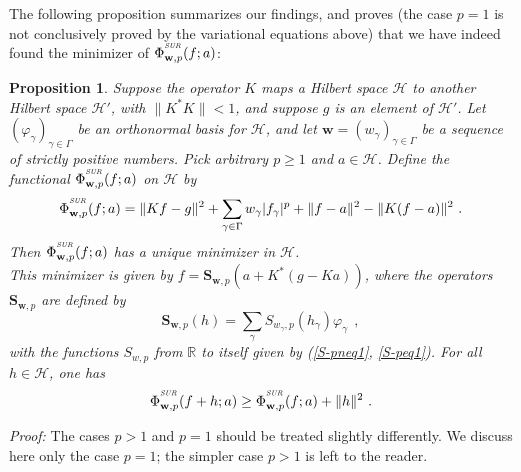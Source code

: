 \documentclass[10pt]{article}
\newtheorem{proposition}[theorem]{Proposition}
\def\R{\mathbb{R}}
\def\S{\mathbf{S}}
\def\cH{\mathcal{H}}
\def\K{K^*}
\def\SUR{\mbox{\tiny{\it{SUR}}}}
\def\fg{f_{\gamma}}
\def\ag{w_{\gamma}}
\def\vpg{\varphi_{\gamma}}
\def\g{\gamma}
\begin{document}
The following proposition summarizes our findings, and proves (the case
$p=1$ is not conclusively proved by the variational equations above)
that we have indeed found the minimizer of
${\Phi}^{^{\SUR}}_{\mathbf{w},p}(f ; a)$:
\begin{proposition}
\label{prop-2-1} Suppose the operator $K$ maps a Hilbert space $\cH$
to another Hilbert space $\cH'$, with $\|\K K\| < 1$,
and suppose $g$ is an element of $\cH'$.
Let $(\vpg)_{\gamma \in \Gamma}$
be an orthonormal basis for $\cH$, and
let $\mathbf{w}=(\ag)_{\g \in \Gamma}$ be a sequence
of strictly positive numbers. Pick
arbitrary $p \geq 1$ and $a \in \cH$. Define the
functional ${\Phi}^{^{\SUR}}_{\mathbf{w},p}(f ; a)$ on $\cH$ by
$$
{\Phi}^{^{\SUR}}_{\mathbf{w},p}(f ; a)=\|Kf-g\|^2 + \sum_{\g \in
\Gamma} \ag |\fg|^p
+\|f-a\|^2-\|K(f-a)\|^2 ~.
$$
Then ${\Phi}^{^{\SUR}}_{\mathbf{w},p}(f ; a)$ has a unique minimizer
in $\cH$. \\
This minimizer
is given by $f=\S_{\mathbf{w},p}\left(a +\K (g-Ka) \right)$, where
the operators $\S_{\mathbf{w},p}$ are defined by
\begin{equation}
\label{def-SS}
\S_{\mathbf{w},p}(h)= \sum_{\gamma} S_{\ag,p}(h_{\gamma}) \vpg ~~,
\end{equation}
with the functions $S_{w,p}$ from $\R$ to itself given by
{\rm (\ref{S-pneq1}, \ref{S-peq1})}. For all $h \in \cH$, one has
$$
{\Phi}^{^{\SUR}}_{\mathbf{w},p}(f+h ; a)
\geq {\Phi}^{^{\SUR}}_{\mathbf{w},p}(f ;a)+\|h\|^2~.
$$
\end{proposition}
{\em Proof:}
The cases $p>1$ and $p=1$ should be treated slightly differently. We discuss
here only the case $p=1$; the simpler case $p>1$ is left to the reader.
\end{document}
